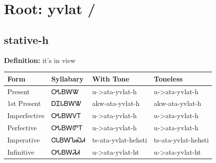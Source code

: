 \documentclass{article}%
\begin{document}
%
\normalsize%
\section*{Root: yvlat / }%
\subsection*{stative-h}%
\textbf{Definition: }%
it’s in view%
\\[0.5em]%
\begin{tabular}{|l|l|l|l|}%
\hline%
\textbf{Form}&\textbf{Syllabary}&\textbf{With Tone}&\textbf{Toneless}\\%
\hline%
Present&ᎤᏓᏴᎳᏔ&u{-}>ata{-}yvlat{-}h&u{-}>ata{-}yvlat{-}h\\%
1st Present&ᎠᏆᏓᏴᎳᏔ&akw{-}ata{-}yvlat{-}h&akw{-}ata{-}yvlat{-}h\\%
Imperfective&ᎤᏓᏴᎳᏙᎢ&u{-}>ata{-}yvlat{-}h&u{-}>ata{-}yvlat{-}h\\%
Perfective&ᎤᏓᏴᎳᏛᎢ&u{-}>ata{-}yvlat{-}h&u{-}>ata{-}yvlat{-}h\\%
Imperative&ᏣᏓᏴᎳᏖᏍᏗ&ts{-}ata{-}yvlat{-}hehsti&ts{-}ata{-}yvlat{-}hehsti\\%
Infinitive&ᎤᏓᏴᎳᏘᏗ&u{-}>ata{-}yvlat{-}ht&u{-}>ata{-}yvlat{-}ht\\%
\hline%
\end{tabular}%
\\[1em]%
\end{document}
